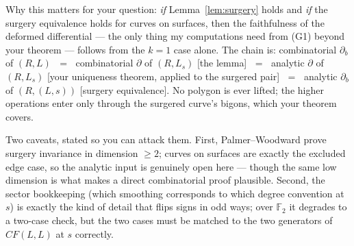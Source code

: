 \documentclass[11pt,reqno]{amsart}
\theoremstyle{plain}
\theoremstyle{definition}
\newcommand{\F}{\mathbb{F}}
\newcommand{\CF}{\mathit{CF}}
\newcommand{\bc}{b}
\begin{document}
Why this matters for your question: \emph{if} Lemma~\ref{lem:surgery} holds and \emph{if} the
surgery equivalence holds for curves on surfaces, then the faithfulness of the deformed
differential --- the only thing my computations need from (G1) beyond your theorem --- follows
from the $k=1$ case alone. The chain is: combinatorial $\partial_\bc$ of $(R,L)$
$\;=\;$ combinatorial $\partial$ of $(R,L_s)$ [the lemma] $\;=\;$ analytic $\partial$ of
$(R,L_s)$ [your uniqueness theorem, applied to the surgered pair] $\;=\;$ analytic
$\partial_\bc$ of $(R,(L,s))$ [surgery equivalence]. No polygon is ever lifted; the higher
operations enter only through the surgered curve's bigons, which your theorem covers.

Two caveats, stated so you can attack them. First, Palmer--Woodward prove surgery invariance
in dimension $\ge2$; curves on surfaces are exactly the excluded edge case, so the analytic
input is genuinely open here --- though the same low dimension is what makes a direct
combinatorial proof plausible. Second, the sector bookkeeping (which smoothing corresponds to
which degree convention at $s$) is exactly the kind of detail that flips signs in odd ways;
over $\F_2$ it degrades to a two-case check, but the two cases must be matched to the two
generators of $\CF(L,L)$ at $s$ correctly.
\end{document}
